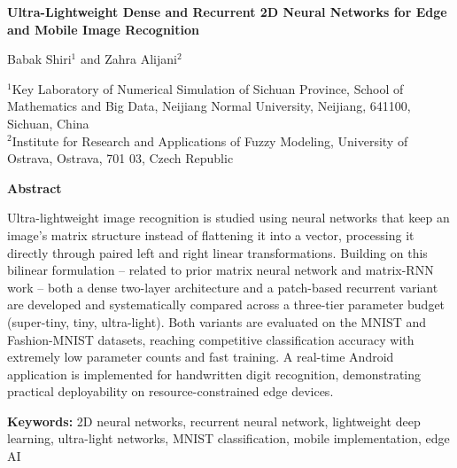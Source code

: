 \documentclass[11pt]{article}
\begin{document}
\begin{center}
{\Large\bfseries Ultra-Lightweight Dense and Recurrent 2D Neural Networks for Edge and Mobile Image Recognition}

\vspace{0.5em}
Babak Shiri$^{1}$ and Zahra Alijani$^{2}$

\vspace{0.3em}
\small
$^{1}$Key Laboratory of Numerical Simulation of Sichuan Province, School of Mathematics and Big Data, Neijiang Normal University, Neijiang, 641100, Sichuan, China\\
$^{2}$Institute for Research and Applications of Fuzzy Modeling, University of Ostrava, Ostrava, 701 03, Czech Republic
\end{center}

\vspace{1em}
\noindent\textbf{Abstract}

\noindent Ultra-lightweight image recognition is studied using neural networks that keep an image's matrix structure instead of flattening it into a vector, processing it directly through paired left and right linear transformations. Building on this bilinear formulation -- related to prior matrix neural network and matrix-RNN work -- both a dense two-layer architecture and a patch-based recurrent variant are developed and systematically compared across a three-tier parameter budget (super-tiny, tiny, ultra-light). Both variants are evaluated on the MNIST and Fashion-MNIST datasets, reaching competitive classification accuracy with extremely low parameter counts and fast training. A real-time Android application is implemented for handwritten digit recognition, demonstrating practical deployability on resource-constrained edge devices.

\vspace{1em}
\noindent\textbf{Keywords:} 2D neural networks, recurrent neural network, lightweight deep learning, ultra-light networks, MNIST classification, mobile implementation, edge AI
\end{document}
